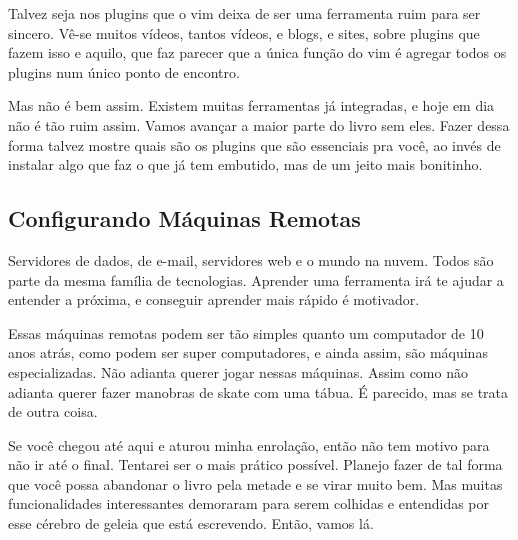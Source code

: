 Talvez seja nos plugins que o vim deixa de ser uma ferramenta ruim para ser sincero.
Vê-se muitos vídeos, tantos vídeos, e blogs, e sites, sobre plugins que fazem isso e aquilo,
que faz parecer que a única função do vim é agregar todos os plugins num único ponto de encontro.

Mas não é bem assim. Existem muitas ferramentas já integradas, e hoje em dia não é tão ruim assim.
Vamos avançar a maior parte do livro sem eles.
Fazer dessa forma talvez mostre quais são os plugins que são essenciais pra você,
ao invés de instalar algo que faz o que já tem embutido, mas de um jeito mais bonitinho.

\subsection{Configurando Máquinas Remotas}
Servidores de dados, de e-mail, servidores web e o mundo na nuvem.
Todos são parte da mesma família de tecnologias.
Aprender uma ferramenta irá te ajudar a entender a próxima, e conseguir aprender mais rápido é motivador.

Essas máquinas remotas podem ser tão simples quanto um computador de 10 anos atrás, como podem ser super computadores, e ainda assim, são máquinas especializadas.
Não adianta querer jogar nessas máquinas.
Assim como não adianta querer fazer manobras de skate com uma tábua.
É parecido, mas se trata de outra coisa.

Se você chegou até aqui e aturou minha enrolação, então não tem motivo para não ir até o final.
Tentarei ser o mais prático possível.
Planejo fazer de tal forma que você possa abandonar o livro pela metade e se virar muito bem.
Mas muitas funcionalidades interessantes demoraram para serem colhidas e entendidas por esse cérebro
de geleia que está escrevendo. Então, vamos lá.

\newpage
